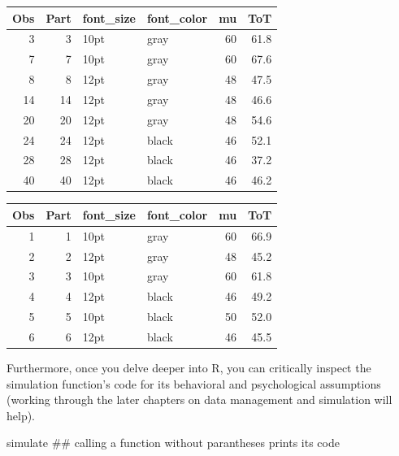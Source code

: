 \documentclass[]{svmono}
\newenvironment{Shaded}{\begin{snugshade}}{\end{snugshade}}
\newcommand{\KeywordTok}[1]{\textcolor[rgb]{0.13,0.29,0.53}{\textbf{#1}}}
\newcommand{\DataTypeTok}[1]{\textcolor[rgb]{0.13,0.29,0.53}{#1}}
\newcommand{\DecValTok}[1]{\textcolor[rgb]{0.00,0.00,0.81}{#1}}
\newcommand{\StringTok}[1]{\textcolor[rgb]{0.31,0.60,0.02}{#1}}
\newcommand{\OperatorTok}[1]{\textcolor[rgb]{0.81,0.36,0.00}{\textbf{#1}}}
\newcommand{\NormalTok}[1]{#1}
\theoremstyle{definition}
\theoremstyle{definition}
\theoremstyle{definition}
\theoremstyle{remark}
\begin{document}
\begin{Shaded}
\end{Shaded}

\begin{longtable}[]{@{}rrllrr@{}}
\toprule
Obs & Part & font\_size & font\_color & mu & ToT\tabularnewline
\midrule
\endhead
3 & 3 & 10pt & gray & 60 & 61.8\tabularnewline
7 & 7 & 10pt & gray & 60 & 67.6\tabularnewline
8 & 8 & 12pt & gray & 48 & 47.5\tabularnewline
14 & 14 & 12pt & gray & 48 & 46.6\tabularnewline
20 & 20 & 12pt & gray & 48 & 54.6\tabularnewline
24 & 24 & 12pt & black & 46 & 52.1\tabularnewline
28 & 28 & 12pt & black & 46 & 37.2\tabularnewline
40 & 40 & 12pt & black & 46 & 46.2\tabularnewline
\bottomrule
\end{longtable}

\begin{Shaded}
\end{Shaded}

\begin{longtable}[]{@{}rrllrr@{}}
\toprule
Obs & Part & font\_size & font\_color & mu & ToT\tabularnewline
\midrule
\endhead
1 & 1 & 10pt & gray & 60 & 66.9\tabularnewline
2 & 2 & 12pt & gray & 48 & 45.2\tabularnewline
3 & 3 & 10pt & gray & 60 & 61.8\tabularnewline
4 & 4 & 12pt & black & 46 & 49.2\tabularnewline
5 & 5 & 10pt & black & 50 & 52.0\tabularnewline
6 & 6 & 12pt & black & 46 & 45.5\tabularnewline
\bottomrule
\end{longtable}

Furthermore, once you delve deeper into R, you can critically inspect
the simulation function's code for its behavioral and psychological
assumptions (working through the later chapters on data management and
simulation will help).

\begin{Shaded}
\begin{Highlighting}[]
\NormalTok{simulate ## calling a function without parantheses prints its code}
\end{Highlighting}
\end{Shaded}
\end{document}
